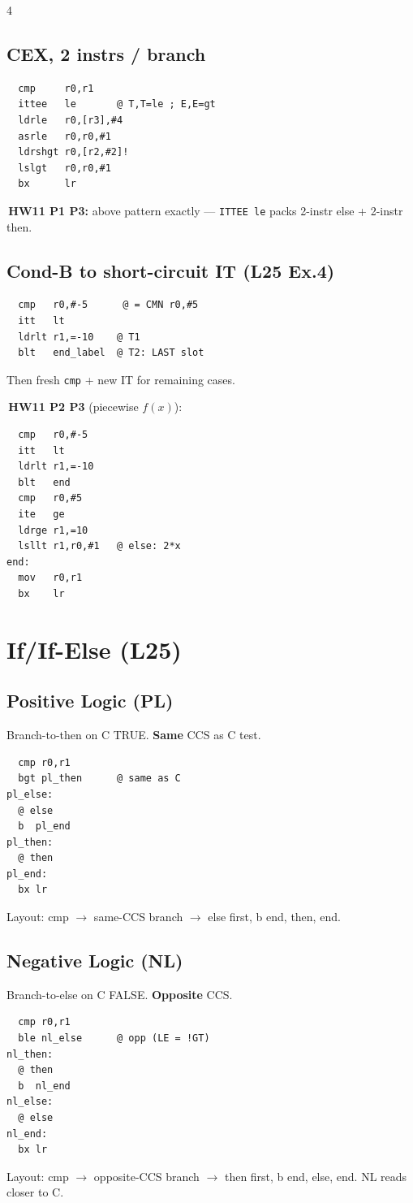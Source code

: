\documentclass[8pt,landscape]{extarticle}
\newcommand{\asm}[1]{\texttt{\scriptsize #1}}
\newenvironment{ex}
  {\par\smallskip\noindent{\scriptsize\color{red!55!black}\textbf{Ex.}}\,\scriptsize\ignorespaces}
  {\par}
\begin{document}
\begin{multicols*}{4}
\subsection{CEX, 2 instrs / branch}
\begin{lstlisting}
  cmp     r0,r1
  ittee   le       @ T,T=le ; E,E=gt
  ldrle   r0,[r3],#4
  asrle   r0,r0,#1
  ldrshgt r0,[r2,#2]!
  lslgt   r0,r0,#1
  bx      lr
\end{lstlisting}
\begin{ex}\textbf{HW11 P1 P3:} above pattern exactly --- \asm{ITTEE le} packs 2-instr else + 2-instr then.\end{ex}

\subsection{Cond-B to short-circuit IT (L25 Ex.4)}
\begin{lstlisting}
  cmp   r0,#-5      @ = CMN r0,#5
  itt   lt
  ldrlt r1,=-10    @ T1
  blt   end_label  @ T2: LAST slot
\end{lstlisting}
Then fresh \asm{cmp} + new IT for remaining cases.

\begin{ex}\textbf{HW11 P2 P3} (piecewise $f(x)$):
\begin{lstlisting}
  cmp   r0,#-5
  itt   lt
  ldrlt r1,=-10
  blt   end
  cmp   r0,#5
  ite   ge
  ldrge r1,=10
  lsllt r1,r0,#1   @ else: 2*x
end:
  mov   r0,r1
  bx    lr
\end{lstlisting}\end{ex}

\section{If/If-Else (L25)}

\subsection{Positive Logic (PL)}
Branch-to-then on C TRUE. \textbf{Same} CCS as C test.
\begin{lstlisting}
  cmp r0,r1
  bgt pl_then      @ same as C
pl_else:
  @ else
  b  pl_end
pl_then:
  @ then
pl_end:
  bx lr
\end{lstlisting}
Layout: cmp $\to$ same-CCS branch $\to$ else first, b end, then, end.

\subsection{Negative Logic (NL)}
Branch-to-else on C FALSE. \textbf{Opposite} CCS.
\begin{lstlisting}
  cmp r0,r1
  ble nl_else      @ opp (LE = !GT)
nl_then:
  @ then
  b  nl_end
nl_else:
  @ else
nl_end:
  bx lr
\end{lstlisting}
Layout: cmp $\to$ opposite-CCS branch $\to$ then first, b end, else, end. NL reads closer to C.


\end{multicols*}
\end{document}
